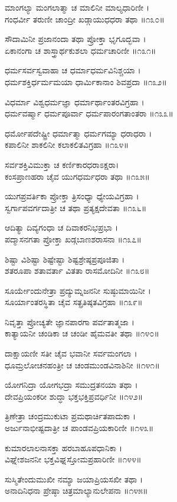 ಮಾಂಗಲ್ಯಾ ಮಂಗಲಾತ್ಮಾ ಚ ಮಾಲಿನೀ ಮಾಲ್ಯಧಾರಿಣೀ ।\\
ಗಂಧರ್ವೀ ತರುಣೀ ಚಾಂದ್ರೀ ಖಡ್ಗಾಯುಧಧರಾ ತಥಾ ॥೧೩೦॥

ಸೌದಾಮಿನೀ ಪ್ರಜಾನಂದಾ ತಥಾ ಪ್ರೋಕ್ತಾ ಭೃಗೂದ್ಭವಾ ।\\
ಏಕಾನಂಗಾ ಚ ಶಾಸ್ತ್ರಾರ್ಥಕುಶಲಾ ಧರ್ಮಚಾರಿಣೀ ॥೧೩೧॥

ಧರ್ಮಸರ್ವಸ್ವವಾಹಾ ಚ ಧರ್ಮಾಧರ್ಮವಿನಿಶ್ಚಯಾ ।\\
ಧರ್ಮಶಕ್ತಿರ್ಧರ್ಮಮಯಾ ಧಾರ್ಮಿಕಾನಾಂ ಶಿವಪ್ರದಾ ॥೧೩೨॥

ವಿಧರ್ಮಾ ವಿಶ್ವಧರ್ಮಜ್ಞಾ ಧರ್ಮಾರ್ಥಾಂತರವಿಗ್ರಹಾ ।\\
ಧರ್ಮವರ್ಷ್ಮಾ ಧರ್ಮಪೂರ್ವಾ ಧರ್ಮಪಾರಂಗತಾಂತರಾ ॥೧೩೩॥

ಧರ್ಮೋಪದೇಷ್ಟ್ರೀ ಧರ್ಮಾತ್ಮಾ ಧರ್ಮಗಮ್ಯಾ ಧರಾಧರಾ ।\\
ಕಪಾಲಿನೀ ಶಾಕಲಿನೀ ಕಲಾಕಲಿತವಿಗ್ರಹಾ ॥೧೩೪॥

ಸರ್ವಶಕ್ತಿವಿಮುಕ್ತಾ ಚ ಕರ್ಣಿಕಾರಧರಾಽಕ್ಷರಾ।\\
ಕಂಸಪ್ರಾಣಹರಾ ಚೈವ ಯುಗಧರ್ಮಧರಾ ತಥಾ ॥೧೩೫॥

ಯುಗಪ್ರವರ್ತಿಕಾ ಪ್ರೋಕ್ತಾ ತ್ರಿಸಂಧ್ಯಾ ಧ್ಯೇಯವಿಗ್ರಹಾ ।\\
ಸ್ವರ್ಗಾಪವರ್ಗದಾತ್ರೀ ಚ ತಥಾ ಪ್ರತ್ಯಕ್ಷದೇವತಾ ॥೧೩೬॥

ಆದಿತ್ಯಾ ದಿವ್ಯಗಂಧಾ ಚ ದಿವಾಕರನಿಭಪ್ರಭಾ ।\\
ಪದ್ಮಾಸನಗತಾ ಪ್ರೋಕ್ತಾ ಖಡ್ಗಬಾಣಶರಾಸನಾ ॥೧೩೭॥

ಶಿಷ್ಟಾ ವಿಶಿಷ್ಟಾ ಶಿಷ್ಟೇಷ್ಟಾ ಶಿಷ್ಟಶ್ರೇಷ್ಠಪ್ರಪೂಜಿತಾ ।\\
ಶತರೂಪಾ ಶತಾವರ್ತಾ ವಿತತಾ ರಾಸಮೋದಿನೀ ॥೧೩೮॥

ಸೂರ್ಯೇಂದುನೇತ್ರಾ ಪ್ರದ್ಯುಮ್ನಜನನೀ ಸುಷ್ಠುಮಾಯಿನೀ ।\\
ಸೂರ್ಯಾಂತರಸ್ಥಿತಾ ಚೈವ ಸತ್ಪ್ರತಿಷ್ಠತವಿಗ್ರಹಾ ॥೧೩೯॥

ನಿವೃತ್ತಾ ಪ್ರೋಚ್ಯತೇ ಜ್ಞಾನಪಾರಗಾ ಪರ್ವತಾತ್ಮಜಾ ।\\
ಕಾತ್ಯಾಯನೀ ಚಂಡಿಕಾ ಚ ಚಂಡೀ ಹೈಮವತೀ ತಥಾ ॥೧೪೦॥

ದಾಕ್ಷಾಯಣೀ ಸತೀ ಚೈವ ಭವಾನೀ ಸರ್ವಮಂಗಲಾ ।\\
ಧೂಮ್ರಲೋಚನಹಂತ್ರೀ ಚ ಚಂಡಮುಂಡವಿನಾಶಿನೀ ॥೧೪೧॥

ಯೋಗನಿದ್ರಾ ಯೋಗಭದ್ರಾ ಸಮುದ್ರತನಯಾ ತಥಾ ।\\
ದೇವಪ್ರಿಯಂಕರೀ ಶುದ್ಧಾ ಭಕ್ತಭಕ್ತಿಪ್ರವರ್ಧಿನೀ ॥೧೪೨॥

ತ್ರಿಣೇತ್ರಾ ಚಂದ್ರಮುಕುಟಾ ಪ್ರಮಥಾರ್ಚಿತಪಾದುಕಾ ।\\
ಅರ್ಜುನಾಭೀಷ್ಟದಾತ್ರೀ ಚ ಪಾಂಡವಪ್ರಿಯಕಾರಿಣೀ ॥೧೪೩॥

ಕುಮಾರಲಾಲನಾಸಕ್ತಾ ಹರಬಾಹೂಪಧಾನಿಕಾ ।\\
ವಿಘ್ನೇಶಜನನೀ ಭಕ್ತವಿಘ್ನಸ್ತೋಮಪ್ರಹಾರಿಣೀ ॥೧೪೪॥

ಸುಸ್ಮಿತೇಂದುಮುಖೀ ನಮ್ಯಾ ಜಯಾಪ್ರಿಯಸಖೀ ತಥಾ ।\\
ಅನಾದಿನಿಧನಾ ಪ್ರೇಷ್ಠಾ ಚಿತ್ರಮಾಲ್ಯಾನುಲೇಪನಾ ॥೧೪೫॥

